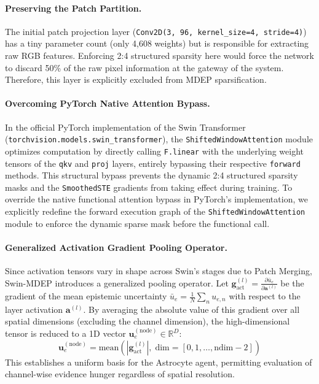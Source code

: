 \documentclass[letterpaper]{article} %
\newcommand{\R}{\mathbb{R}}
\begin{document}
\paragraph{Preserving the Patch Partition.}
The initial patch projection layer (\texttt{Conv2D(3, 96, kernel\_size=4, stride=4)}) has a tiny parameter count (only 4,608 weights) but is responsible for extracting raw RGB features. Enforcing 2:4 structured sparsity here would force the network to discard 50\% of the raw pixel information at the gateway of the system. Therefore, this layer is explicitly excluded from MDEP sparsification.

\paragraph{Overcoming PyTorch Native Attention Bypass.}
In the official PyTorch implementation of the Swin Transformer (\texttt{torchvision.models.swin\_transformer}), the \texttt{ShiftedWindowAttention} module optimizes computation by directly calling \texttt{F.linear} with the underlying weight tensors of the \texttt{qkv} and \texttt{proj} layers, entirely bypassing their respective \texttt{forward} methods. This structural bypass prevents the dynamic 2:4 structured sparsity masks and the \texttt{SmoothedSTE} gradients from taking effect during training. To override the native functional attention bypass in PyTorch's implementation, we explicitly redefine the forward execution graph of the \texttt{ShiftedWindowAttention} module to enforce the dynamic sparse mask before the functional call.

\paragraph{Generalized Activation Gradient Pooling Operator.}
Since activation tensors vary in shape across Swin's stages due to Patch Merging, Swin-MDEP introduces a generalized pooling operator. Let $\bm{g}_{\text{act}}^{(l)} = \frac{\partial \bar{u}_e}{\partial \bm{a}^{(l)}}$ be the gradient of the mean epistemic uncertainty $\bar{u}_e = \frac{1}{N}\sum_n u_{e,n}$ with respect to the layer activation $\bm{a}^{(l)}$. By averaging the absolute value of this gradient over all spatial dimensions (excluding the channel dimension), the high-dimensional tensor is reduced to a 1D vector $\bm{u}_e^{(\text{node})} \in \R^D$:
\begin{equation}\label{eq:activation_pooling}
    \bm{u}_e^{(\text{node})} = \text{mean}\!\left(|\bm{g}_{\text{act}}^{(l)}|,\; \text{dim}=[0, 1, \ldots, \text{ndim}-2]\right)
\end{equation}
This establishes a uniform basis for the Astrocyte agent, permitting evaluation of channel-wise evidence hunger regardless of spatial resolution.
\end{document}

